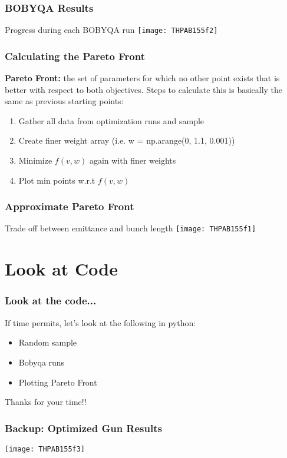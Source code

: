 \documentclass{beamer}
\begin{document}
\begin{frame}
	\frametitle{BOBYQA Results}
	Progress during each BOBYQA run
	\texttt{[image: THPAB155f2]}
\end{frame}

\begin{frame}
	\frametitle{Calculating the Pareto Front}
	\textbf{Pareto Front:} the set of parameters for which
	no other point exists that is better with respect to both objectives. 
	Steps to calculate this is basically the same as previous starting points: \\
	\begin{enumerate}
		\item Gather all data from optimization runs and sample
		\item Create finer weight array (i.e. w = np.arange(0, 1.1, 0.001))
		\item Minimize $f(v,w)$ again with finer weights
		\item Plot min points w.r.t $f(v,w)$
	\end{enumerate}
\end{frame}



\begin{frame}
	\frametitle{Approximate Pareto Front}
	\centering
	Trade off between emittance and bunch length
	\texttt{[image: THPAB155f1]}
\end{frame}

\section{Look at Code}
\begin{frame}
	\frametitle{Look at the code...}
	If time permits, let's look at the following in python:
	\begin{itemize}
		\item Random sample
		\item Bobyqa runs
		\item Plotting Pareto Front
	\end{itemize}
	
\end{frame}

\begin{frame}
	\huge Thanks for your time!!\\ 
	\vskip12pt
\end{frame}

\begin{frame}
	\frametitle{Backup: Optimized Gun Results}
	\texttt{[image: THPAB155f3]}
\end{frame}
\end{document}
